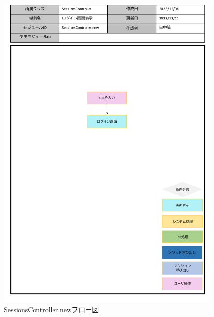 \begin{figure}
	\centering
	\includegraphics[scale=0.6]{img/Sessions/pptx/SessionsController_new.pdf}
	\caption{SessionsController.newフロー図}
\end{figure}
\clearpage
